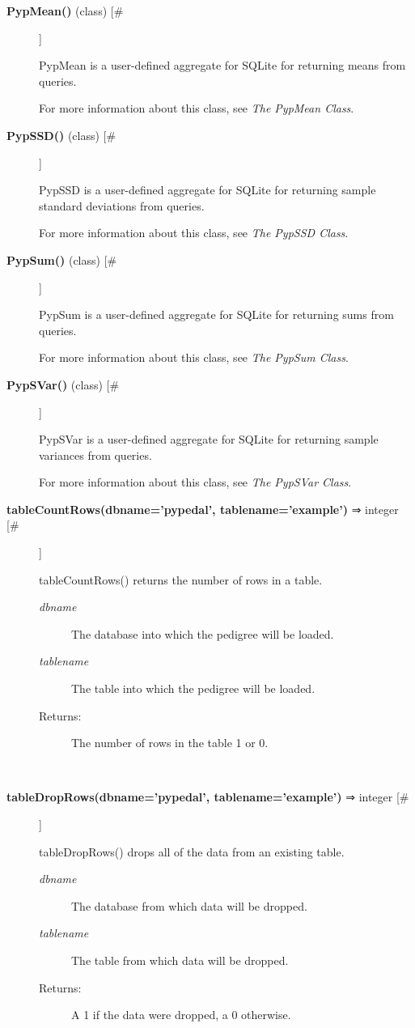 \documentclass{article}
\begin{document}
\begin{description}
\item[\textbf{PypMean()} (class) [\#]
]
\par PypMean is a user-defined aggregate for SQLite for returning means from queries.
\par For more information about this class, see \textit{The PypMean Class}.

\item[\textbf{PypSSD()} (class) [\#]
]
\par PypSSD is a user-defined aggregate for SQLite for returning sample standard deviations
from queries.
\par For more information about this class, see \textit{The PypSSD Class}.

\item[\textbf{PypSum()} (class) [\#]
]
\par PypSum is a user-defined aggregate for SQLite for returning sums from queries.
\par For more information about this class, see \textit{The PypSum Class}.

\item[\textbf{PypSVar()} (class) [\#]
]
\par PypSVar is a user-defined aggregate for SQLite for returning sample variances
from queries.
\par For more information about this class, see \textit{The PypSVar Class}.

\item[\textbf{tableCountRows(dbname='pypedal', tablename='example')} ⇒ integer [\#]
]
\par tableCountRows() returns the number of rows in a table.
\begin{description}
\item[\textit{dbname}
]
The database into which the pedigree will be loaded.
\item[\textit{tablename}
]
The table into which the pedigree will be loaded.
\item[Returns:
]
The number of rows in the table 1 or 0.
\end{description}\\

\item[\textbf{tableDropRows(dbname='pypedal', tablename='example')} ⇒ integer [\#]
]
\par tableDropRows() drops all of the data from an existing table.
\begin{description}
\item[\textit{dbname}
]
The database from which data will be dropped.
\item[\textit{tablename}
]
The table from which data will be dropped.
\item[Returns:
]
A 1 if the data were dropped, a 0 otherwise.
\end{description}\\


\end{description}
\end{document}
